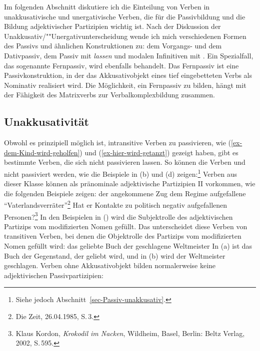 Im folgenden Abschnitt diskutiere ich die Einteilung von Verben in unakkusativische und unergativische Verben,
die für die Passivbildung und die Bildung adjektivischer Partizipien wichtig ist. 
Nach der Diskussion der Unakkusativ/""Unergativunterscheidung wende ich
mich verschiedenen Formen des Passivs und ähnlichen Konstruktionen zu: dem Vorgangs- und
dem Dativpassiv, dem Passiv mit \emph{lassen} und modalen Infinitiven mit
\sein. Ein Spezialfall, das sogenannte Fernpassiv, wird ebenfalls behandelt. Das Fernpassiv
ist eine Passivkonstruktion, in der das Akkusativobjekt eines tief eingebetteten Verbs als
Nominativ realisiert wird. Die Möglichkeit, ein Fernpassiv zu bilden, hängt mit der Fähigkeit
des Matrixverbs zur Verbalkomplexbildung zusammen.

\subsection{Unakkusativität}
\label{sec-unakkusativitaet}\label{sec-unaccusativity}
\label{sec-phen-hilfsverbselektion}

Obwohl es prinzipiell möglich ist, intransitive Verben zu passivieren, wie
(\ref{ex-dem-Kind-wird-geholfen}) und (\ref{ex-hier-wird-getanzt}) gezeigt haben,
gibt es bestimmte Verben, die sich nicht passivieren lassen.
So können die Verben  und   nicht passiviert werden,
wie die Beispiele in (b) und (d) zeigen:\footnote{%
Siehe jedoch Abschnitt~\ref{sec-Passiv-unakkusativ}.
}
\eal
\label{ex-passive-erg}
\zl
{}%
Verben aus dieser Klasse können als pränominale adjektivische Partizipien II vorkommen,
wie die folgenden Beispiele zeigen:
\eal
\label{ex-prenominal-erg}
\ex 
der angekommene Zug
\ex
dem Regime aufgefallene "`Vaterlandsverräter"'\footnote{
        Die Zeit, 26.04.1985, S.\,3.%
}
\ex Hat er Kontakte zu politisch negativ aufgefallenen Personen?\footnote{
   Klaus Kordon, \emph{Krokodil im Nacken}, Wildheim, Basel, Berlin: Beltz Verlag, 2002, S.\,595.%
}
\zl
In den Beispielen in () wird die Subjektrolle des adjektivischen Partizips vom
modifizierten Nomen gefüllt. Das unterscheidet diese Verben von transitiven Verben,
bei denen die Objektrolle des Partizips vom modifizierten Nomen gefüllt wird:
\pagebreak
\eal
\ex das geliebte Buch
\ex der geschlagene Weltmeister
\zl
In (a) ist das Buch der Gegenstand, der geliebt wird, und in (b)
wird der Weltmeister geschlagen. Verben ohne Akkusativobjekt bilden normalerweise
keine adjektivischen Passivpartizipien:
\eal
\label{ex-prenominal-nerg}
\zl

